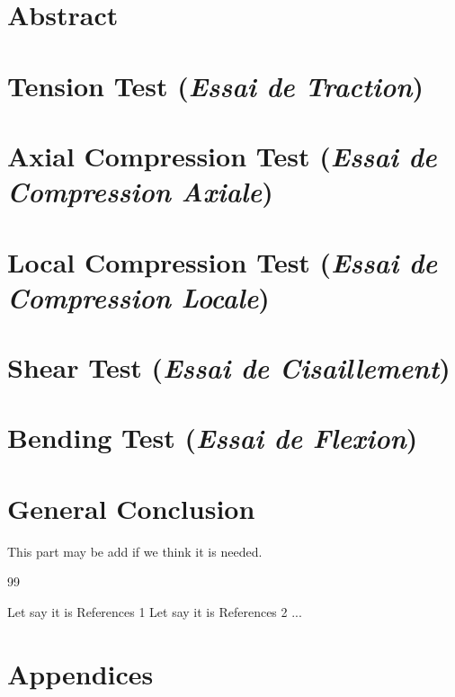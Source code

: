 \documentclass[12pt,twoside,a4paper,openany]{report}
\begin{document}
%

{}
\section*{Abstract}

\clearpage
\section{Tension Test (\textit{Essai de Traction})}

\clearpage
\section{Axial Compression Test (\textit{Essai de Compression Axiale})}

\clearpage
\section{Local Compression Test (\textit{Essai de Compression Locale})}

\clearpage
\section{Shear Test (\textit{Essai de Cisaillement})}

\clearpage
\section{Bending Test (\textit{Essai de Flexion})}

\clearpage
{}
{}
\section*{General Conclusion}
This part may be add if we think it is needed.
\clearpage
\renewcommand{\chapter}{\section}
\renewcommand{\thechapter}{} %
\renewcommand{\bibname}{References}  %
\begin{thebibliography}{99}
 Let say it is References 1
 Let say it is References 2 ...
\end{thebibliography}


\clearpage

\section*{Appendices}

\end{document}
